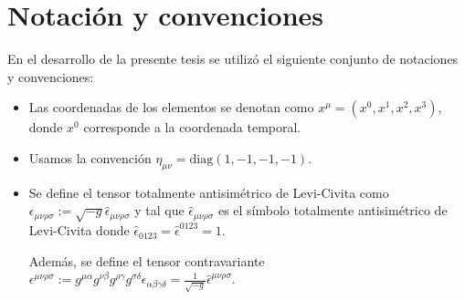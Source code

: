 \chapter{Notación y convenciones}
\label{ape:convenciones}

En el desarrollo de la presente tesis se utilizó el siguiente conjunto de notaciones y convenciones:

\begin{itemize}
\item Las coordenadas de los elementos se denotan como $x^{\mu}=\left( x^0, x^1, x^2, x^3 \right)$, donde $x^0$ corresponde a la coordenada temporal.
\item Usamos la convención $\eta_{\mu \nu} = \mathrm{diag}(1,-1,-1,-1)$.
\item Se define el tensor totalmente antisimétrico de Levi-Civita como $\epsilon_{\mu \nu \rho \sigma} := \sqrt{-g} \hat{\epsilon}_{\mu \nu \rho \sigma}$ y tal que $\hat{\epsilon}_{\mu \nu \rho \sigma}$ es el símbolo totalmente antisimétrico de Levi-Civita donde $\hat{\epsilon}_{0123} = \hat{\epsilon}^{0123} = 1$.

Además, se define el tensor contravariante $\epsilon^{\mu \nu \rho \sigma} := g^{\mu \alpha} g^{\nu \beta} g^{\rho \gamma} g^{\sigma \delta} \epsilon_{\alpha \beta \gamma \delta} = \frac{1}{\sqrt{-g}} \hat{\epsilon}^{\mu \nu \rho \sigma}$.


\end{itemize}
